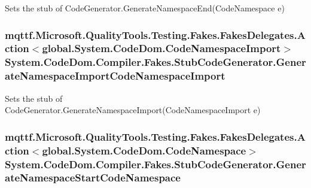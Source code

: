 Sets the stub of Code\-Generator.\-Generate\-Namespace\-End(\-Code\-Namespace e)

\hypertarget{class_system_1_1_code_dom_1_1_compiler_1_1_fakes_1_1_stub_code_generator_af0ba655861a833aa3d50ed197ca7b0ae}{
\subsubsection[{Generate\-Namespace\-Import\-Code\-Namespace\-Import}]{\setlength{\rightskip}{0pt plus 5cm}mqttf.\-Microsoft.\-Quality\-Tools.\-Testing.\-Fakes.\-Fakes\-Delegates.\-Action$<$global.\-System.\-Code\-Dom.\-Code\-Namespace\-Import$>$ System.\-Code\-Dom.\-Compiler.\-Fakes.\-Stub\-Code\-Generator.\-Generate\-Namespace\-Import\-Code\-Namespace\-Import}}\label{class_system_1_1_code_dom_1_1_compiler_1_1_fakes_1_1_stub_code_generator_af0ba655861a833aa3d50ed197ca7b0ae}


Sets the stub of Code\-Generator.\-Generate\-Namespace\-Import(\-Code\-Namespace\-Import e)

\hypertarget{class_system_1_1_code_dom_1_1_compiler_1_1_fakes_1_1_stub_code_generator_a7f6c9b29d0100652beee4776a297c112}{
\subsubsection[{Generate\-Namespace\-Start\-Code\-Namespace}]{\setlength{\rightskip}{0pt plus 5cm}mqttf.\-Microsoft.\-Quality\-Tools.\-Testing.\-Fakes.\-Fakes\-Delegates.\-Action$<$global.\-System.\-Code\-Dom.\-Code\-Namespace$>$ System.\-Code\-Dom.\-Compiler.\-Fakes.\-Stub\-Code\-Generator.\-Generate\-Namespace\-Start\-Code\-Namespace}}\label{class_system_1_1_code_dom_1_1_compiler_1_1_fakes_1_1_stub_code_generator_a7f6c9b29d0100652beee4776a297c112}


